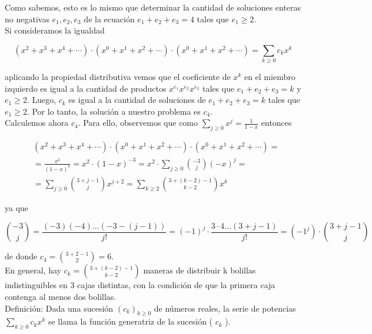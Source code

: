 \documentclass[10pt]{article}
\begin{document}
Como sabemos, esto es lo mismo que determinar la cantidad de soluciones enteras no negativas $e_{1}, e_{2}, e_{3}$ de la ecuación $e_{1}+e_{2}+e_{3}=4$ tales que $e_{1} \geq 2$.\\
Si consideramos la igualdad

$$
\left(x^{2}+x^{3}+x^{4}+\cdots\right) \cdot\left(x^{0}+x^{1}+x^{2}+\cdots\right) \cdot\left(x^{0}+x^{1}+x^{2}+\cdots\right)=\sum_{k \geq 0} c_{k} x^{k}
$$

aplicando la propiedad distributiva vemos que el coeficiente de $x^{k}$ en el miembro izquierdo es igual a la cantidad de productos $x^{e_{1}} x^{e_{2}} x^{e_{3}}$ tales que $e_{1}+e_{2}+e_{3}=k$ y $e_{1} \geq 2$. Luego, $c_{k}$ es igual a la cantidad de soluciones de $e_{1}+e_{2}+e_{3}=k$ tales que $e_{1} \geq 2$. Por lo tanto, la solución a nuestro problema es $c_{4}$.\\
Calculemos ahora $c_{4}$. Para ello, observemos que como $\sum_{j \geq 0} x^{j}=\frac{1}{1-x}$ entonces

$$
\begin{aligned}
& \left(x^{2}+x^{3}+x^{4}+\cdots\right) \cdot\left(x^{0}+x^{1}+x^{2}+\cdots\right) \cdot\left(x^{0}+x^{1}+x^{2}+\cdots\right)= \\
& =\frac{x^{2}}{(1-x)^{3}}=x^{2} \cdot(1-x)^{-3}=x^{2} \cdot \sum_{j \geq 0}\binom{-3}{j}(-x)^{j}= \\
& =\sum_{j \geq 0}\binom{3+j-1}{j} x^{j+2}=\sum_{k \geq 2}\binom{3+(k-2)-1}{k-2} x^{k}
\end{aligned}
$$

ya que

$$
\binom{-3}{j}=\frac{(-3)(-4) \ldots(-3-(j-1))}{j!}=(-1)^{j} \cdot \frac{3 \cdot 4 \ldots(3+j-1)}{j!}=\left(-1^{j}\right) \cdot\binom{3+j-1}{j}
$$

de donde $c_{4}=\binom{3+2-1}{2}=6$.\\
En general, hay $c_{k}=\binom{3+(k-2)-1}{k-2}$ maneras de distribuir k bolillas indistinguibles en 3 cajas distintas, con la condición de que la primera caja contenga al menos dos bolillas.\\
Definición: Dada una sucesión $\left(c_{k}\right)_{k \geq 0}$ de números reales, la serie de potencias $\sum_{k \geq 0} c_{k} x^{k}$ se llama la función generatriz de la sucesión ( $c_{k}$ ).
\end{document}
